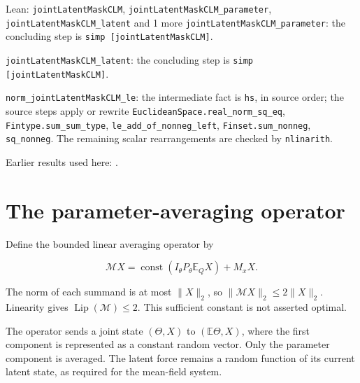 \documentclass[11pt,a4paper]{article}
\begin{document}
\begin{leanbox}{Lean: \texttt{jointLatentMaskCLM}, \texttt{jointLatentMaskCLM\_\allowbreak{}parameter}, \texttt{jointLatentMaskCLM\_\allowbreak{}latent} and 1 more}
\texttt{joint\allowbreak{}Latent\allowbreak{}Mask\allowbreak{}CLM\_\allowbreak{}parameter}: the concluding step is \texttt{simp [joint\allowbreak{}Latent\allowbreak{}Mask\allowbreak{}CLM]}.



\texttt{joint\allowbreak{}Latent\allowbreak{}Mask\allowbreak{}CLM\_\allowbreak{}latent}: the concluding step is \texttt{simp [joint\allowbreak{}Latent\allowbreak{}Mask\allowbreak{}CLM]}.



\texttt{norm\_\allowbreak{}joint\allowbreak{}Latent\allowbreak{}Mask\allowbreak{}CLM\_\allowbreak{}le}: the intermediate fact is \texttt{hs}, in source order; the source steps apply or rewrite \texttt{Euclidean\allowbreak{}Space.\allowbreak{}real\_\allowbreak{}norm\_\allowbreak{}sq\_\allowbreak{}eq}, \texttt{Fintype.\allowbreak{}sum\_\allowbreak{}sum\_\allowbreak{}type}, \texttt{le\_\allowbreak{}add\_\allowbreak{}of\_\allowbreak{}nonneg\_\allowbreak{}left}, \texttt{Finset.\allowbreak{}sum\_\allowbreak{}nonneg}, \texttt{sq\_\allowbreak{}nonneg}. The remaining scalar rearrangements are checked by \texttt{nlinarith}.
\end{leanbox}


Earlier results used here: \cite[Section~3.1.1]{LangevinLean2026IPLA}.

\section{\texorpdfstring{The parameter-averaging operator}{The parameter-averaging operator}}


Define the bounded linear averaging operator by

\[\mathcal M X=\operatorname{const}(I_\theta P_\theta\mathbb E_QX)+M_xX.\]

The norm of each summand is at most \(\|X\|_2\), so \(\|\mathcal M X\|_2\le2\|X\|_2\). Linearity gives \(\operatorname{Lip}(\mathcal M)\le2\). This sufficient constant is not asserted optimal.



The operator sends a joint state \((\Theta,X)\) to \((\mathbb E\Theta,X)\), where the first component is represented as a constant random vector. Only the parameter component is averaged. The latent force remains a random function of its current latent state, as required for the mean-field system.
\end{document}
